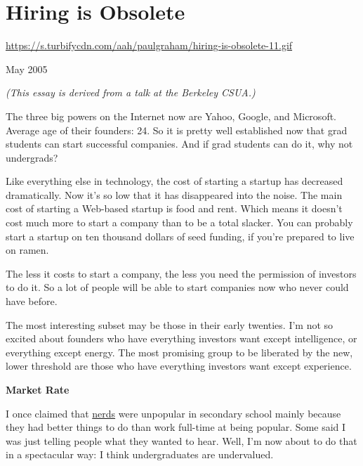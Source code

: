 \chapter{Hiring is Obsolete}


            
              
                \href{https://s.turbifycdn.com/aah/paulgraham/hiring-is-obsolete-11.gif}{https://s.turbifycdn.com/aah/paulgraham/hiring-is-obsolete-11.gif}




                  
                    May 2005

\emph{(This essay is derived from a talk at the Berkeley
                      CSUA.)}

The three big powers on the Internet now are
                    Yahoo, Google, and Microsoft. Average age of their founders:
                    24. So it is pretty well established now that grad students
                    can start successful companies. And if grad students can do
                    it, why not undergrads?

Like everything else in
                    technology, the cost of starting a startup has decreased
                    dramatically. Now it's so low that it has disappeared into
                    the noise. The main cost of starting a Web-based startup is
                    food and rent. Which means it doesn't cost much more to
                    start a company than to be a total slacker. You can probably
                    start a startup on ten thousand dollars of seed funding, if
                    you're prepared to live on ramen.

The less it
                    costs to start a company, the less you need the permission
                    of investors to do it. So a lot of people will be able to
                    start companies now who never could have before.

The
                    most interesting subset may be those in their early
                    twenties. I'm not so excited about founders who have
                    everything investors want except intelligence, or everything
                    except energy. The most promising group to be liberated by
                    the new, lower threshold are those who have everything
                    investors want except experience.

\textbf{Market Rate}

I once claimed that
                    \href{http://www.paulgraham.com/nerds.html}{nerds} were unpopular in secondary
                    school mainly because they had better things to do than work
                    full-time at being popular. Some said I was just telling
                    people what they wanted to hear. Well, I'm now about to do
                    that in a spectacular way: I think undergraduates are
                    undervalued.

